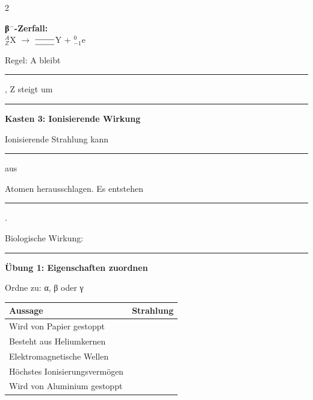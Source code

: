 \documentclass[10pt, a4paper]{article}
\newcommand{\fachfarbe}{physik}
\newcommand{\luecke}[1]{\rule{#1}{0.4pt}}
\newcommand{\abschnitt}[1]{%
    \vspace{8pt}\noindent\textbf{\textcolor{\fachfarbe}{#1}}\vspace{4pt}
}
\begin{document}
\begin{multicols}{2}
\begin{merksatz}
\textbf{β$^-$-Zerfall:}\\
$^{A}_{Z}$X $\rightarrow$ $^{\text{\luecke{0.8cm}}}_{\text{\luecke{0.8cm}}}$Y + $^{0}_{-1}$e

\vspace{4pt}
Regel: A bleibt \luecke{1.5cm}, Z steigt um \luecke{1cm}
\end{merksatz}

\vspace{6pt}


\abschnitt{Kasten 3: Ionisierende Wirkung}

\begin{merksatz}[Definition]
Ionisierende Strahlung kann \luecke{2cm} aus

Atomen herausschlagen. Es entstehen \luecke{2cm}.

\vspace{6pt}

Biologische Wirkung: \luecke{3cm}
\end{merksatz}

\columnbreak


\abschnitt{Übung 1: Eigenschaften zuordnen}

Ordne zu: α, β oder γ

\vspace{4pt}
\begin{tabular}{|p{4.5cm}|c|}
\hline
\textbf{Aussage} & \textbf{Strahlung} \\
\hline
Wird von Papier gestoppt & \\
\hline
Besteht aus Heliumkernen & \\
\hline
Elektromagnetische Wellen & \\
\hline
Höchstes Ionisierungsvermögen & \\
\hline
Wird von Aluminium gestoppt & \\
\hline
\end{tabular}

\vspace{8pt}



\end{multicols}
\end{document}
